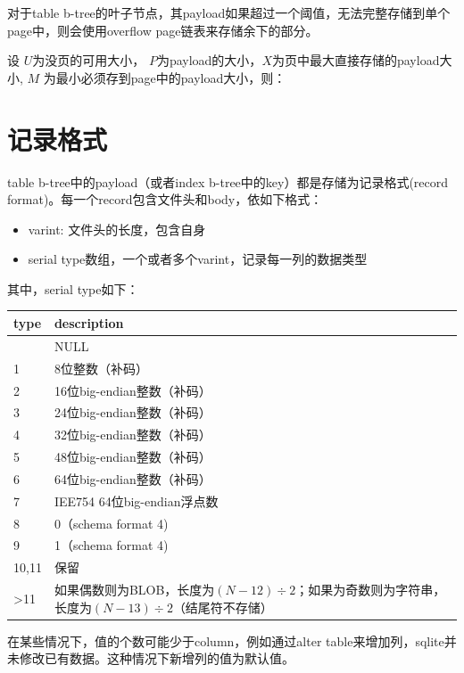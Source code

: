 \documentclass[12pt]{article}
\begin{document}
对于table b-tree的叶子节点，其payload如果超过一个阈值，无法完整存储到单个page中，则会使用overflow page链表来存储余下的部分。

设 \(U\)为没页的可用大小， \(P\)为payload的大小，\(X\)为页中最大直接存储的payload大小, \(M\) 为最小必须存到page中的payload大小，则：

\section{记录格式}\label{ux8bb0ux5f55ux683cux5f0f}

table b-tree中的payload（或者index b-tree中的key）都是存储为记录格式(record format)。每一个record包含文件头和body，依如下格式：

\begin{itemize}
\tightlist
\item
  varint: 文件头的长度，包含自身
\item
  serial type数组，一个或者多个varint，记录每一列的数据类型
\end{itemize}

其中，serial type如下：

{\def\LTcaptype{none} %
\begin{longtable}[]{@{}ll@{}}
\toprule\noalign{}
type & description \\
\midrule\noalign{}
\endhead
\bottomrule\noalign{}
\endlastfoot
0 & NULL \\
1 & 8位整数（补码） \\
2 & 16位big-endian整数（补码） \\
3 & 24位big-endian整数（补码） \\
4 & 32位big-endian整数（补码） \\
5 & 48位big-endian整数（补码） \\
6 & 64位big-endian整数（补码） \\
7 & IEE754 64位big-endian浮点数 \\
8 & 0（schema format 4) \\
9 & 1（schema format 4) \\
10,11 & 保留 \\
\textgreater11 & 如果偶数则为BLOB，长度为\((N-12) \div 2\)；如果为奇数则为字符串，长度为\((N-13) \div 2\)（结尾符不存储） \\
\end{longtable}
}

在某些情况下，值的个数可能少于column，例如通过alter table来增加列，sqlite并未修改已有数据。这种情况下新增列的值为默认值。
\end{document}
